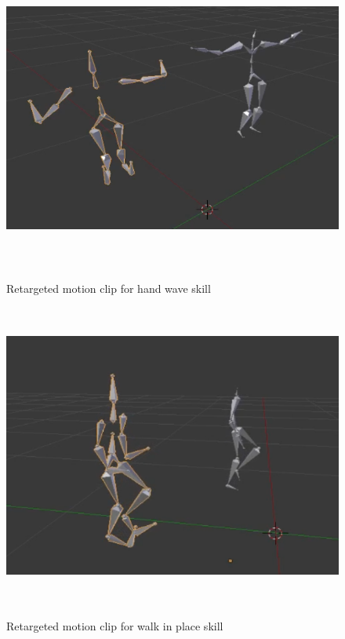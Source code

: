 \begin{figure}[!b]
  \centering
  \href{https://youtu.be/UpT7YPi6Ekc}{\includegraphics[width=1\linewidth, height=10cm]{images/retarget_wave.png}}
  \caption{Retargeted motion clip for hand wave skill}
  \label{fig:retarget_wave}
\end{figure}
\begin{figure} 
  \centering
  \href{https://youtu.be/wdyNuvNhy3o}{\includegraphics[width=1\linewidth, height=10cm]{images/retarget_wip.png}}
  \caption{Retargeted motion clip for walk in place skill}
  \label{fig:retarget_wip}
\end{figure}
